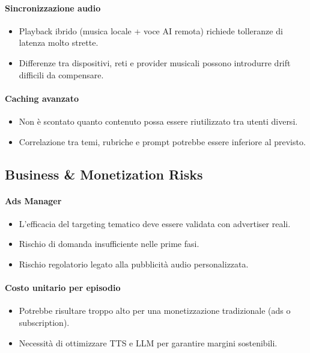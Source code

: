 \documentclass[11pt,a4paper]{article}
\begin{document}
\paragraph{Sincronizzazione audio}
\begin{itemize}
    \item Playback ibrido (musica locale + voce AI remota) richiede tolleranze di latenza molto strette.
    \item Differenze tra dispositivi, reti e provider musicali possono introdurre drift difficili da compensare.
\end{itemize}

\paragraph{Caching avanzato}
\begin{itemize}
    \item Non è scontato quanto contenuto possa essere riutilizzato tra utenti diversi.
    \item Correlazione tra temi, rubriche e prompt potrebbe essere inferiore al previsto.
\end{itemize}


\subsection{Business \& Monetization Risks}

\paragraph{Ads Manager}
\begin{itemize}
    \item L’efficacia del targeting tematico deve essere validata con advertiser reali.
    \item Rischio di domanda insufficiente nelle prime fasi.
    \item Rischio regolatorio legato alla pubblicità audio personalizzata.
\end{itemize}

\paragraph{Costo unitario per episodio}
\begin{itemize}
    \item Potrebbe risultare troppo alto per una monetizzazione tradizionale (ads o subscription).
    \item Necessità di ottimizzare TTS e LLM per garantire margini sostenibili.
\end{itemize}
\end{document}
